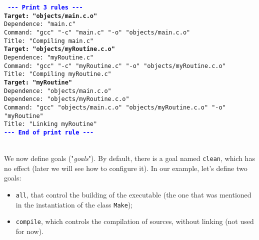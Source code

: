 \documentclass[a4paper,11pt]{extarticle}
\begin{document}
\begin{mdframed}[hidealllines=true,backgroundcolor=lightgray!20]
\tt\footnotesize
\textcolor{blue}{\bf{-}{-}{-} Print 3 rules {-}{-}{-}}\\
\textcolor{OliveGreen}{\bf Target: "objects/main.c.o"}\\
\hspace*{1.2em}Dependence: "main.c"\\
\hspace*{1.2em}Command:  "gcc" "-c" "main.c" "-o" "objects/main.c.o"\\
\hspace*{1.2em}Title: "Compiling main.c"\\
\textcolor{OliveGreen}{\bf Target: "objects/myRoutine.c.o"}\\
\hspace*{1.2em}Dependence: "myRoutine.c"\\
\hspace*{1.2em}Command:  "gcc" "-c" "myRoutine.c" "-o" "objects/myRoutine.c.o"\\
\hspace*{1.2em}Title: "Compiling myRoutine.c"\\
\textcolor{OliveGreen}{\bf Target: "myRoutine"}\\
\hspace*{1.2em}Dependence: "objects/main.c.o"\\
\hspace*{1.2em}Dependence: "objects/myRoutine.c.o"\\
\hspace*{1.2em}Command:  "gcc" "objects/main.c.o" "objects/myRoutine.c.o" "-o" "myRoutine"\\
\hspace*{1.2em}Title: "Linking myRoutine"\\
\textcolor{blue}{\bf{-}{-}{-} End of print rule {-}{-}{-}}
\end{mdframed}

~\\We now define goals ("\emph{goals}"). By default, there is a goal named \texttt{clean}, which has no effect (later we will see how to configure it). In our example, let's define two goals:
\begin{itemize}
  \item \texttt{all}, that control the building of the executable (the one that was mentioned in the instantiation of the class \texttt{Make});
  \item \texttt{compile}, which controls the compilation of sources, without linking (not used for now).
\end{itemize}
\end{document}
